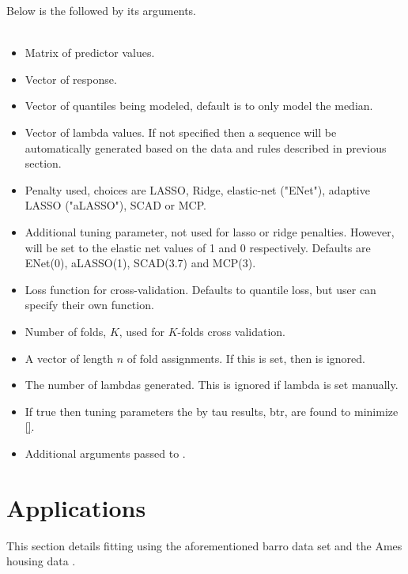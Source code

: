 \documentclass[article]{rqPenVignette}%
\begin{document}
Below is the  followed by its arguments. \\
\\
\begin{itemize}
\item[\code{x}] Matrix of predictor values. 
\item[\code{y}] Vector of response. 
\item[\code{tau}] Vector of quantiles being modeled, default is to only model the median.
\item[\code{lambda}] Vector of lambda values. If not specified then a sequence will be automatically generated based on the data and rules described in previous section. 
\item[\code{penalty}] Penalty used, choices are LASSO, Ridge, elastic-net ("ENet"), adaptive LASSO ("aLASSO"), SCAD or MCP. 
\item[\code{a}] Additional tuning parameter, not used for lasso or ridge penalties. However, will be set to the elastic net values of 1 and 0 respectively. Defaults are ENet(0), aLASSO(1), SCAD(3.7) and MCP(3).
\item[\code{cvFunc}] Loss function for cross-validation. Defaults to quantile loss, but user can specify their own function.
\item[\code{folds}] Number of folds, $K$, used for $K$-folds cross validation. 
\item[\code{foldid}] A vector of length $n$ of fold assignments. If this is set, then  is ignored. 
\item[\code{nlambda}] The number of lambdas generated. This is ignored if lambda is set manually. 
\item[\code{groupError}] If true then tuning parameters the by tau results, btr, are found to minimize \eqref{}. 
\item[\code{...}] Additional arguments passed to . 
\end{itemize}

% 
% 
% 

\section{Applications}
This section details fitting using the aforementioned barro data set and the Ames housing data \citep{de2011ames}. %
\end{document}
